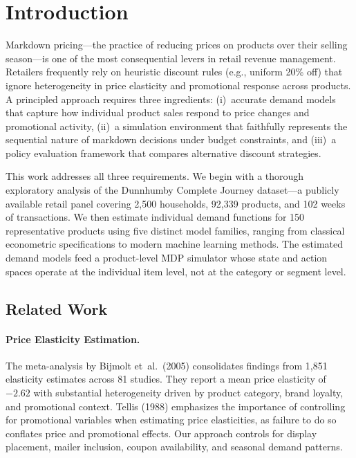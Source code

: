 \documentclass[12pt,a4paper]{article}
\begin{document}
\tableofcontents
\newpage

\section{Introduction}
\label{sec:intro}

Markdown pricing---the practice of reducing prices on products over
their selling season---is one of the most consequential levers in
retail revenue management. Retailers frequently rely on heuristic
discount rules (e.g., uniform 20\% off) that ignore heterogeneity in
price elasticity and promotional response across products. A principled
approach requires three ingredients: (i)~accurate demand models that
capture how individual product sales respond to price changes and
promotional activity, (ii)~a simulation environment that faithfully
represents the sequential nature of markdown decisions under budget
constraints, and (iii)~a policy evaluation framework that compares
alternative discount strategies.

This work addresses all three requirements. We begin with a thorough
exploratory analysis of the Dunnhumby Complete Journey dataset---a
publicly available retail panel covering 2,500 households, 92,339
products, and 102 weeks of transactions. We then estimate individual
demand functions for 150 representative products using five distinct
model families, ranging from classical econometric specifications to
modern machine learning methods. The estimated demand models feed a
product-level MDP simulator whose state and action spaces operate at
the individual item level, not at the category or segment level.

\subsection{Related Work}

\paragraph{Price Elasticity Estimation.}
The meta-analysis by Bijmolt et~al.\ (2005) consolidates findings
from 1,851 elasticity estimates across 81 studies. They report a mean
price elasticity of $-2.62$ with substantial heterogeneity driven by
product category, brand loyalty, and promotional context. Tellis
(1988) emphasizes the importance of controlling for promotional
variables when estimating price elasticities, as failure to do so
conflates price and promotional effects. Our approach controls for
display placement, mailer inclusion, coupon availability, and
seasonal demand patterns.
\end{document}
